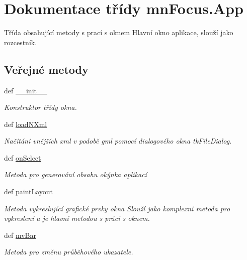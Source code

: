 \hypertarget{classmnFocus_1_1App}{\section{Dokumentace třídy mn\-Focus.\-App}
\label{db/d36/classmnFocus_1_1App}
}


Třída obsahující metody s prací s oknem Hlavní okno aplikace, slouží jako rozcestník.  


\subsection*{Veřejné metody}
\begin{DoxyCompactItemize}
\item 
def \hyperlink{classmnFocus_1_1App_a97bc8ac328112964677c50ac80a0eee5}{\-\_\-\-\_\-init\-\_\-\-\_\-}
\begin{DoxyCompactList}\small\item\em Konstruktor třídy okna. \end{DoxyCompactList}\item 
def \hyperlink{classmnFocus_1_1App_a6a8df6016b56a84b88025c5058069fb5}{load\-N\-Xml}
\begin{DoxyCompactList}\small\item\em Načítání vnějších xml v podobě gml pomocí dialogového okna tk\-File\-Dialog. \end{DoxyCompactList}\item 
def \hyperlink{classmnFocus_1_1App_a3dded74c82de81f3918cc0ea2bd1cd69}{on\-Select}
\begin{DoxyCompactList}\small\item\em Metoda pro generování obsahu okýnka aplikací \end{DoxyCompactList}\item 
def \hyperlink{classmnFocus_1_1App_a600fc232b0400302e1f235e1e1b463f7}{paint\-Layout}
\begin{DoxyCompactList}\small\item\em Metoda vykreslující grafické prvky okna Slouží jako komplexní metoda pro vykreslení a je hlavní metodou s práci s oknem. \end{DoxyCompactList}\item 
def \hyperlink{classmnFocus_1_1App_abeafb220b3de369f9c53303aee0021b5}{mv\-Bar}
\begin{DoxyCompactList}\small\item\em Metoda pro změnu průběhového ukazatele. \end{DoxyCompactList}\item 

\end{DoxyCompactItemize}
